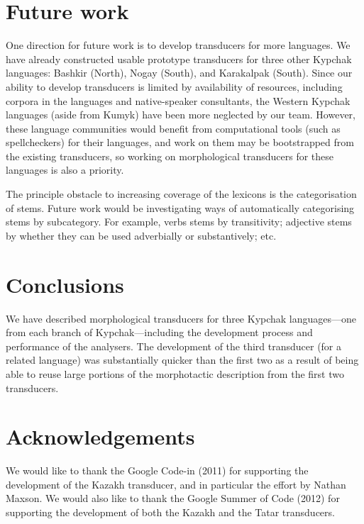 \documentclass[a4paper,11pt,twocolumn]{article}
\begin{document}
\section{Future work}


One direction for future work is to develop transducers for more languages.  We have already constructed usable prototype transducers for three other Kypchak languages: Bashkir (North), Nogay (South), and Karakalpak (South).  Since our ability to develop transducers is limited by availability of resources, including corpora in the languages and native-speaker consultants, the Western Kypchak languages (aside from Kumyk) have been more neglected by our team.  However, these language communities would benefit from computational tools (such as spellcheckers) for their languages, and work on them may be bootstrapped from the existing transducers, so working on morphological transducers for these languages is also a priority.

The principle obstacle to increasing coverage of the lexicons is the categorisation of stems. Future work would be investigating ways of automatically categorising stems by subcategory. For example, verbs stems by transitivity; adjective stems by whether  they can be used adverbially or substantively; etc. 

\section{Conclusions}\label{sec:conclusions}

We have described morphological transducers for three Kypchak languages---one from each branch of Kypchak---including the development process and performance of the analysers. The development of the third transducer (for a related language) was substantially quicker than the first two as a result of being able to reuse large portions of the morphotactic description from the first two transducers.

\section*{Acknowledgements}

We would like to thank the Google Code-in (2011) for supporting the development 
of the Kazakh transducer, and in particular the effort by Nathan Maxson. We 
would also like to thank the Google Summer of Code (2012) for supporting the 
development of both the Kazakh and the Tatar transducers. 
\end{document}
